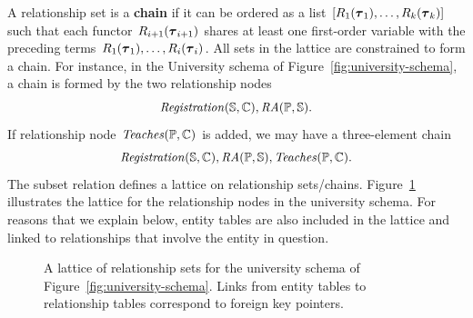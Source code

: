 \documentclass{vldb}
\begin{document}
A relationship set is a \textbf{chain} if it can be ordered as a list $[R_{1}(\boldsymbol{\tau}_{1}),\ldots,R_{k}(\boldsymbol{\tau}_{k})]$ 
such that each functor $R_{i+1}(\boldsymbol{\tau}_{i+1})$ shares at least one first-order variable with the preceding terms $R_{1}(\boldsymbol{\tau}_{1}),\ldots,R_{i}(\boldsymbol{\tau}_{i})$.
All sets in the lattice are constrained to form a chain.
%
For instance, in the University schema of Figure~\ref{fig:university-schema}, a %
chain is formed by the two relationship nodes
\[\mathit{Registration}(\mathbb{S},\mathbb{C}),\mathit{RA}(\mathbb{P},\mathbb{S}).\]
If relationship node $\it{Teaches}(\mathbb{P},\mathbb{C})$ is added,
we may have a three-element chain \[\mathit{Registration}(\mathbb{S},\mathbb{C}),\mathit{RA}(\mathbb{P},\mathbb{S}),\it{Teaches}(\mathbb{P},\mathbb{C}).\] 
The subset relation defines a lattice on relationship sets/chains. 
Figure~\ref{fig:big-lattice} illustrates the  lattice for the relationship nodes in the university schema. 
For reasons that we explain below, entity tables are also included in the lattice and linked to relationships that involve the entity in question. 
\begin{figure}[htbp]
\begin{center}

\caption{A lattice of relationship sets for the university schema of Figure~\ref{fig:university-schema}.
 Links from entity tables to relationship tables correspond to foreign key pointers. 
\label{fig:big-lattice}}
\end{center}
\end{figure}
\end{document}

